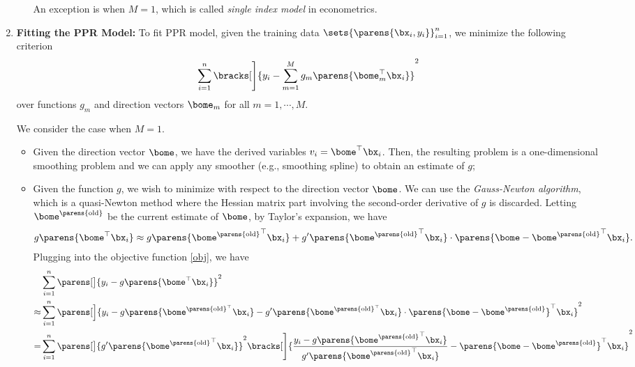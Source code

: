 \documentclass[12pt]{article}
\begin{document}
\begin{enumerate}[label=\textbf{\arabic*.}]
\begin{enumerate}
		An exception is when $M = 1$, which is called \textit{single index model} in econometrics. 
	\end{enumerate}
	
	\item \textbf{Fitting the PPR Model:} To fit PPR model, given the training data $\sets{ \parens{\bx_i, y_i}}_{i=1}^n$, we minimize the following criterion 
	\begin{equation}\label{obj}
		\sum_{i=1}^n \bracks[\Bigg]{ y_i - \sum_{m=1}^M g_m \parens{\bome_m^\top \bx_i}}^2
	\end{equation}
	over functions $g_m$ and direction vectors $\bome_m$ for all $m = 1, \cdots, M$. 
	
	We consider the case when $M = 1$. 
	\begin{itemize}
		\item Given the direction vector $\bome$, we have the derived variables $v_i = \bome^\top \bx_i$. Then, the resulting problem is a one-dimensional smoothing problem and we can apply any smoother (e.g., smoothing spline) to obtain an estimate of $g$; 
		\item Given the function $g$, we wish to minimize with respect to the direction vector $\bome$. We can use the \textit{Gauss-Newton algorithm}, which is a quasi-Newton method where the Hessian matrix part involving the second-order derivative of $g$ is discarded. Letting $\bome^{\parens{\text{old}}}$ be the current estimate of $\bome$, by Taylor's expansion, we have 
		\begin{align*}
			g \parens{\bome^\top \bx_i} \approx g \parens{{\bome^{\parens{\text{old}}}}^\top \bx_i} + g' \parens{{\bome^{\parens{\text{old}}}}^\top \bx_i} \cdot \parens{\bome - {\bome^{\parens{\text{old}}}}^\top \bx_i}. 
		\end{align*}
		Plugging into the objective function \eqref{obj}, we have 
		\begin{align*}
			& \sum_{i=1}^n \parens[\big]{y_i - g \parens{\bome^\top \bx_i}}^2 \\ 
			\approx & \sum_{i=1}^n \parens[\Big]{y_i - g \parens{{\bome^{\parens{\text{old}}^\top}} \bx_i} - g' \parens{{\bome^{\parens{\text{old}}^\top}} \bx_i} \cdot \parens{\bome - {\bome^{\parens{\text{old}}}}}^\top \bx_i}^2 \\
			= & \sum_{i=1}^n \parens[\big]{g' \parens{{\bome^{\parens{\text{old}}}}^\top \bx_i}}^2 \bracks[\Bigg]{ \frac{y_i - g \parens{{\bome^{\parens{\text{old}}}}^\top \bx_i}}{g' \parens{{\bome^{\parens{\text{old}}}}^\top \bx_i}} - \parens{\bome - \bome^{\parens{\text{old}}}}^\top \bx_i}^2 \\ 

\end{align*}
\end{itemize}
\end{enumerate}
\end{document}
